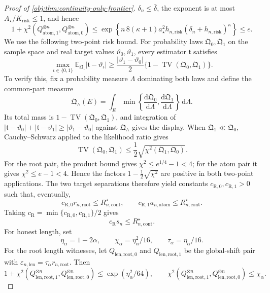 \begin{proof}[Proof of \cref{obj:thm:continuity-only-frontier}]
\(\delta_n\leq\bar\delta\), the exponent is at most \(A_\star/K_{\mathrm{risk}}\leq1\), and hence
\[
1+\chi^2(Q_{\mathrm{atom},1}^{\otimes n},Q_{\mathrm{atom},0}^{\otimes n})
\leq
\exp\!\left\{n\,8(\kappa+1)a_\star^2h_{n,\mathrm{risk}}
(\delta_n+h_{n,\mathrm{risk}})^\kappa\right\}
\leq e .
\]
We use the following two-point risk bound.  For probability laws
\(\mathfrak Q_0,\mathfrak Q_1\) on the sample space and real target values
\(\vartheta_0,\vartheta_1\), every estimator \(\mathfrak t\) satisfies
\[
\max_{\iota\in\{0,1\}}
\mathbb E_{\mathfrak Q_\iota}|\mathfrak t-\vartheta_\iota|
\geq
\frac{|\vartheta_1-\vartheta_0|}{2}
\{1-\operatorname{TV}(\mathfrak Q_0,\mathfrak Q_1)\}.
\]
To verify this, fix a probability measure \(\Lambda\) dominating both laws and define the common-part measure
\[
\mathfrak Q_\wedge(E)=
\int_E
\min\left\{\frac{\mathrm d\mathfrak Q_0}{\mathrm d\Lambda},
          \frac{\mathrm d\mathfrak Q_1}{\mathrm d\Lambda}\right\}
\,\mathrm d\Lambda .
\]
Its total mass is \(1-\operatorname{TV}(\mathfrak Q_0,\mathfrak Q_1)\), and integration of
\(|\mathfrak t-\vartheta_0|+|\mathfrak t-\vartheta_1|\geq
|\vartheta_1-\vartheta_0|\) against \(\mathfrak Q_\wedge\) gives the display.  When
\(\mathfrak Q_1\ll\mathfrak Q_0\), Cauchy--Schwarz applied to the likelihood ratio gives
\[
\operatorname{TV}(\mathfrak Q_0,\mathfrak Q_1)
\leq \frac12\sqrt{\chi^2(\mathfrak Q_1,\mathfrak Q_0)}.
\]
For the root pair, the product bound gives \(\chi^2\leq e^{1/4}-1<4\); for the atom pair it gives
\(\chi^2\leq e-1<4\).  Hence the factors
\(1-\frac12\sqrt{\chi^2}\) are positive in both two-point applications.  The two target separations therefore yield constants
\(c_{\mathrm R,0},c_{\mathrm R,1}>0\) such that, eventually,
\[
c_{\mathrm R,0}r_{n,\mathrm{root}}\leq R_{n,\mathrm{cont}}^\star,
\qquad
c_{\mathrm R,1}a_{n,\mathrm{atom}}\leq R_{n,\mathrm{cont}}^\star .
\]
Taking \(c_{\mathrm R}=\min\{c_{\mathrm R,0},c_{\mathrm R,1}\}/2\) gives
\[
c_{\mathrm R}s_n\leq R_{n,\mathrm{cont}}^\star .
\]
For honest length, set
\[
\eta_\alpha=1-2\alpha,
\qquad
\chi_\alpha=\eta_\alpha^2/16,
\qquad
\tau_\alpha=\eta_\alpha/16 .
\]
For the root length witnesses, let
\(Q_{\mathrm{len},\mathrm{root},0}\) and \(Q_{\mathrm{len},\mathrm{root},1}\) be the global-shift pair with
\(\varepsilon_{n,\mathrm{len}}=\tau_\alpha r_{n,\mathrm{root}}\).  Then
\[
1+\chi^2(Q_{\mathrm{len},\mathrm{root},1}^{\otimes n},
Q_{\mathrm{len},\mathrm{root},0}^{\otimes n})
\leq
\exp(\eta_\alpha^2/64),
\qquad
\chi^2(Q_{\mathrm{len},\mathrm{root},1}^{\otimes n},
Q_{\mathrm{len},\mathrm{root},0}^{\otimes n})\leq \chi_\alpha .
\]
\end{proof}
